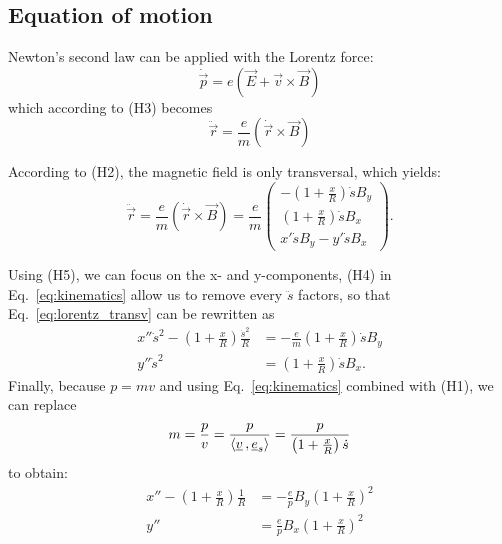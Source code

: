 \subsection{Equation of motion}
\label{sec:eq_motion}
Newton's second law can be applied with the Lorentz force:
\begin{equation}
\dot{\vec{p}} = e(\vec{E}+\vec{v} \times \vec{B}) 
\end{equation}
which according to (H3) becomes
\begin{equation}
\ddot{\vec{r}} = \frac{e}{m}(\dot{\vec{r}} \times \vec{B})
\end{equation}

According to (H2), the magnetic field is only transversal, which yields:
\begin{equation}
\label{eq:lorentz_transv}
\ddot{\vec{r}} = \frac{e}{m}(\dot{\vec{r}} \times \vec{B})
= \frac{e}{m}
    \begin{pmatrix}
        -\left(1+\frac{x}{R}\right)\dot{s}B_y \\
        \left(1+\frac{x}{R}\right)\dot{s}B_x \\
        x'\dot{s}B_y - y'\dot{s}B_x
    \end{pmatrix}.
\end{equation}

Using (H5), we can focus on the x- and y-components, (H4) in Eq.~\eqref{eq:kinematics} allow us to remove every $\ddot{s}$ factors, so that Eq.~\eqref{eq:lorentz_transv} can be rewritten as
\begin{equation}
\begin{aligned}
x'' \dot{s}^2 - \left(1+\frac{x}{R}\right)\frac{\dot{s}^2}{R}
&= -\frac{e}{m} \left(1+\frac{x}{R}\right)\dot{s}B_y \\
y'' \dot{s}^2 &=    \left(1+\frac{x}{R}\right)\dot{s}B_x.
\end{aligned}
\end{equation}
Finally, because $p=mv$ and using Eq.~\eqref{eq:kinematics} combined with (H1), we can replace
\begin{equation}
m = \frac{p}{v} = \frac{p}{\langle \underline{v} {\,,\,} \underline{e}_s \rangle} = \frac{p}{\left(1+\frac{x}{R}\right)\dot{s}}
\end{equation}
to obtain:
\begin{equation}
\begin{aligned}
x''-\left(1+\frac{x}{R}\right)\frac{1}{R} &= -\frac{e}{p} B_y\left(1+\frac{x}{R}\right)^2 \\
y'' &= \frac{e}{p} B_x\left(1+\frac{x}{R}\right)^2
\end{aligned}
\end{equation}

